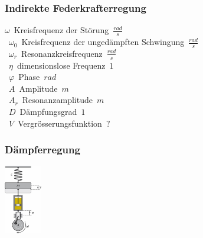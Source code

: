 \subsubsection{Indirekte Federkrafterregung}

\unit{$\omega$}{Kreisfrequenz der Störung}{$\frac{rad}{s}$} \\
\unit{$\omega_0$}{Kreisfrequenz der ungedämpften Schwingung}{$\frac{rad}{s}$} \\
\unit{$\omega_r$}{Resonanzkreisfrequenz}{$\frac{rad}{s}$} \\
\unit{$\eta$}{dimensionslose Frequenz}{$1$} \\
\unit{$\varphi$}{Phase}{$rad$} \\
\unit{$A$}{Amplitude}{$m$} \\
\unit{$A_r$}{Resonanzamplitude}{$m$} \\
\unit{$D$}{Dämpfungsgrad}{$1$} \\
\unit{$V$}{Vergrösserungsfunktion}{$?$} \\

\subsubsection{Dämpferregung}
\begin{center}
	\begin{minipage}{0.4\textwidth}
	\end{minipage}%
	\begin{minipage}{0.1\textwidth}
		\includegraphics[height=3cm,center,keepaspectratio=true]{Images/daempferregung.png}
	\end{minipage}
\end{center}

